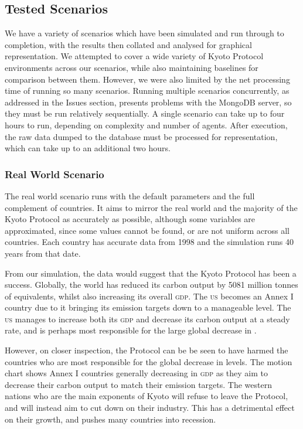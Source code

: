 \subsection{Tested Scenarios}

We have a variety of scenarios which have been simulated and run through to completion, with the results then collated and analysed for graphical representation. We attempted to cover a wide variety of Kyoto Protocol environments across our scenarios, while also maintaining baselines for comparison between them. However, we were also limited by the net processing time of running so many scenarios. Running multiple scenarios concurrently, as addressed in the Issues section, presents problems with the MongoDB server, so they must be run relatively sequentially. A single scenario can take up to four hours to run, depending on complexity and number of agents. After execution, the raw data dumped to the database must be processed for representation, which can take up to an additional two hours.

\subsubsection{Real World Scenario}

The real world scenario runs with the default parameters and the full complement of countries. It aims to mirror the real world and the majority of the Kyoto Protocol as accurately as possible, although some variables are approximated, since some values cannot be found, or are not uniform across all countries. Each country has accurate data from 1998 and the simulation runs 40 years from that date.

From our simulation, the data would suggest that the Kyoto Protocol has been a success. Globally, the world has reduced its carbon output by 5081 million tonnes of \CO equivalents, whilst also increasing its overall \textsc{gdp}. The \textsc{us} becomes an Annex I country due to it bringing its emission targets down to a manageable level. The \textsc{us} manages to increase both its \textsc{gdp} and decrease its carbon output at a steady rate, and is perhaps most responsible for the large global decrease in \CO.

However, on closer inspection, the Protocol can be be seen to have harmed the countries who are most responsible for the global decrease in \CO levels. The motion chart shows Annex I countries generally decreasing in \textsc{gdp} as they aim to decrease their carbon output to match their emission targets. The western nations who are the main exponents of Kyoto will refuse to leave the Protocol, and will instead aim to cut down on their industry. This has a detrimental effect on their growth, and pushes many countries into recession.

